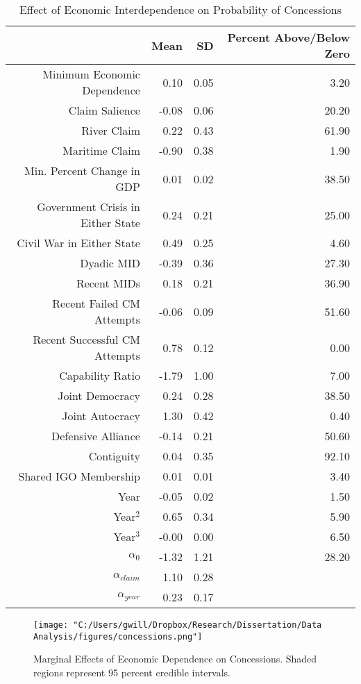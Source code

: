 \documentclass[../../dissertation.tex]{subfiles}
\begin{document}
\begin{table}[ht]
	\caption{Effect of Economic Interdependence on Probability of Concessions}
	\label{tab: concessions}
	\centering
	\begin{tabular}{rrrr}
		\toprule
		& Mean & SD & Percent Above/Below Zero \\ 
		\midrule
		Minimum Economic Dependence & 0.10 & 0.05 & 3.20 \\ 
		Claim Salience & -0.08 & 0.06 & 20.20 \\ 
		River Claim & 0.22 & 0.43 & 61.90 \\ 
		Maritime Claim & -0.90 & 0.38 & 1.90 \\ 
		Min. Percent Change in GDP & 0.01 & 0.02 & 38.50 \\ 
		Government Crisis in Either State & 0.24 & 0.21 & 25.00 \\ 
		Civil War in Either State & 0.49 & 0.25 & 4.60 \\ 
		Dyadic MID & -0.39 & 0.36 & 27.30 \\ 
		Recent MIDs & 0.18 & 0.21 & 36.90 \\ 
		Recent Failed CM Attempts & -0.06 & 0.09 & 51.60 \\ 
		Recent Successful CM Attempts & 0.78 & 0.12 & 0.00 \\ 
		Capability Ratio & -1.79 & 1.00 & 7.00 \\ 
		Joint Democracy & 0.24 & 0.28 & 38.50 \\ 
		Joint Autocracy & 1.30 & 0.42 & 0.40 \\ 
		Defensive Alliance & -0.14 & 0.21 & 50.60 \\ 
		Contiguity & 0.04 & 0.35 & 92.10 \\
		Shared IGO Membership & 0.01 & 0.01 & 3.40 \\ 
		Year & -0.05 & 0.02 & 1.50 \\ 
		Year$^2$ & 0.65 & 0.34 & 5.90 \\ 
		Year$^3$ & -0.00 & 0.00 & 6.50 \\ 
		$\alpha_0$ & -1.32 & 1.21 & 28.20 \\ 
		$\alpha_{claim}$ & 1.10 & 0.28 &  \\ 
		$\alpha_{year}$ & 0.23 & 0.17 &  \\ 
		\bottomrule
	\end{tabular}
	
\end{table}



\begin{figure}

\caption{Marginal Effects of Economic Dependence on Concessions. Shaded regions represent 95 percent credible intervals.}

\label{fig: concessions}

\texttt{[image: "C:/Users/gwill/Dropbox/Research/Dissertation/Data Analysis/figures/concessions.png"]}

\end{figure}
\end{document}

